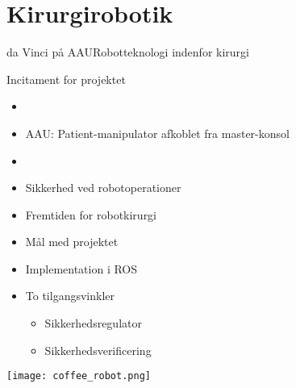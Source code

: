\section{Kirurgirobotik}
\begin{frame}{da Vinci på AAU}{Robotteknologi indenfor kirurgi}
\vspace{8mm}
\begin{block}{Incitament for projektet}
	\begin{itemize}
		\item {}
		\item AAU: Patient-manipulator afkoblet fra master-konsol 
		\item {}
		\item Sikkerhed ved robotoperationer
		\item Fremtiden for robotkirurgi
		\item Mål med projektet
		\item Implementation i ROS
		\item To tilgangsvinkler
		\begin{itemize}
			\item Sikkerhedsregulator
			\item Sikkerhedsverificering
		\end{itemize}
	\end{itemize}
\end{block}
\begin{flushright}
	\vspace{-37mm}
\texttt{[image: coffee\_robot.png]}
\end{flushright}
\vspace{1cm}
\end{frame}

